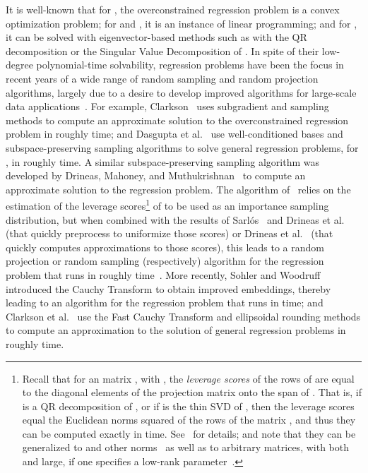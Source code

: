 \documentclass[11pt]{article}
\begin{document}
It is well-known that for , the overconstrained  regression
problem is a convex optimization problem; for  and , it is an
instance of linear programming; and for , it can be solved with
eigenvector-based methods such as with the QR decomposition or the Singular
Value Decomposition of .
In spite of their low-degree polynomial-time solvability,  regression
problems have been the focus in recent years of a wide range of random sampling
and random projection algorithms, largely due to a desire to develop improved
algorithms for large-scale data applications~\cite{AMT10,MSM11_TR,CDMMMW13_SODA}.
For example, Clarkson~\cite{Cla05} uses subgradient and sampling methods to
compute an approximate solution to the overconstrained  regression
problem in roughly  time; and Dasgupta et
al.~\cite{DDHKM09_lp_SICOMP} use well-conditioned bases and subspace-preserving
sampling algorithms to solve general  regression problems, for
, in roughly  time.
A similar subspace-preserving sampling algorithm was developed by Drineas,
Mahoney, and Muthukrishnan~\cite{DMM06} to compute an approximate solution to
the  regression problem.
The algorithm of~\cite{DMM06} relies on the estimation of the  leverage
scores\footnote{Recall that for an  matrix , with , the
  \emph{ leverage scores} of the rows of  are equal to the diagonal
  elements of the projection matrix onto the span of .
  That is, if  is a QR decomposition of , or if  is the
  thin SVD of , then the leverage scores equal the Euclidean norms squared of
  the rows of the  matrix , and thus they can be computed exactly
  in  time.
  See~\cite{Mah-mat-rev_BOOK,DMMW12_ICML} for details; and note that they can be
  generalized to  and other  norms~\cite{CDMMMW13_SODA} as well as
  to arbitrary  matrices, with both  and  large, if one
  specifies a low-rank parameter~\cite{CUR_PNAS,DMMW12_ICML}.}
of  to be used as an importance sampling distribution, but when combined with
the results of Sarl\'{o}s~\cite{Sarlos06} and Drineas et
al.~\cite{DMMS07_FastL2_NM10} (that quickly preprocess  to uniformize those
scores) or Drineas et al.~\cite{DMMW12_ICML} (that quickly computes
approximations to those scores), this leads to a random projection or random
sampling (respectively) algorithm for the  regression problem that runs
in roughly  time~\cite{DMMS07_FastL2_NM10,Mah-mat-rev_BOOK}.
More recently, Sohler and Woodruff~\cite{SW11} introduced the Cauchy Transform
to obtain improved  embeddings, thereby leading to an algorithm for the
 regression problem that runs in  time; and Clarkson
et al.~\cite{CDMMMW13_SODA} use the Fast Cauchy Transform and ellipsoidal rounding
methods to compute an approximation to the solution of general 
regression problems in roughly  time.
\end{document}
